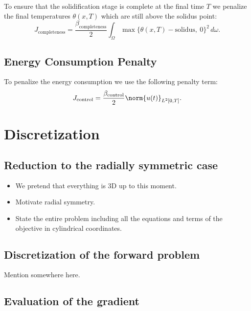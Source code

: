To ensure that the solidification stage is complete at the final time $T$ we penalize the final temperatures $\theta(x, T)$ which are still above the solidus point:
\begin{equation}
	J_{\text{completeness}} =
	\frac{\beta_\text{completeness}}{2} \int_{\Omega} \max\{ \theta(x, T) - \text{solidus},\ 0 \}^2\, d\omega.
\end{equation}

\subsection{Energy Consumption Penalty}

To penalize the energy consumption we use the following penalty term:
\begin{equation}
	J_{\text{control}} =
	\frac{\beta_\text{control}}{2} \norm{u(t)}_{L^2[0,T]}.
\end{equation}



\section{Discretization}
\label{sec:discretization}

\subsection{Reduction to the radially symmetric case}

{\color{TolHighContrastBlue}
\begin{itemize}
	\item We pretend that everything is 3D up to this moment.
	\item Motivate radial symmetry.
	\item State the entire problem including all the equations and terms of the objective in cylindrical coordinates.
\end{itemize}
}

\subsection{Discretization of the forward problem}

{\color{TolHighContrastBlue}
Mention \fenics somewhere here.
}


\subsection{Evaluation of the gradient}

